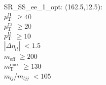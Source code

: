 SR\_SS\_ee\_1\_opt: (162.5,12.5): \\
$p_{\text{T}}^{l1}$ $\geq 40$ \\
$p_{\text{T}}^{l2}$ $\geq 20$ \\
$p_{\text{T}}^{ll}$ $\geq 10$ \\
$|\Delta\eta_{ll}|$ $<1.5$ \\
$m_{\text{eff}}$ $\geq 200$ \\
$m_{\text{T}}^{\text{max}}$ $\geq 130$ \\
$m_{lj}$/$m_{ljj}$ $<105$ \\
